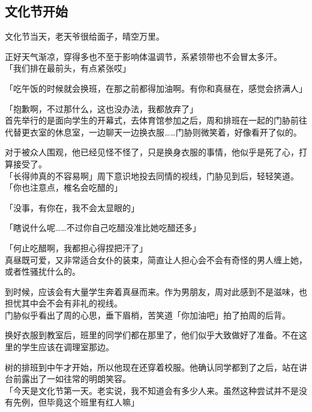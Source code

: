 \subsection{文化节开始}

文化节当天，老天爷很给面子，晴空万里。

正好天气渐凉，穿得多也不至于影响体温调节，系紧领带也不会冒太多汗。\\

「我们排在最前头，有点紧张哎」

「吃午饭的时候就会换班，在那之前都得加油啊。有你和真昼在，感觉会挤满人」

「抱歉啊，不过那什么，这也没办法，我都放弃了」\\

首先举行的是面向学生的开幕式，去体育馆参加之后，周和排班在一起的门胁前往代替更衣室的休息室，一边聊天一边换衣服……门胁则微笑着，好像看开了似的。

对于被众人围观，他已经见怪不怪了，只是换身衣服的事情，他似乎是死了心，打算接受了。\\

「长得帅真的不容易啊」周下意识地投去同情的视线，门胁见到后，轻轻笑道。\\

「你也注意点，椎名会吃醋的」

「没事，有你在，我不会太显眼的」

「瞎说什么呢……不过你自己吃醋没准比她吃醋还多」

「何止吃醋啊，我都担心得捏把汗了」\\

真昼既可爱，又非常适合女仆的装束，简直让人担心会不会有奇怪的男人缠上她，或者性骚扰什么的。

到时候，应该会有大量学生奔着真昼而来。作为男朋友，周对此感到不是滋味，也担忧其中会不会有非礼的视线。\\

门胁似乎看出了周的心思，垂下眉梢，苦笑道「你加油吧」拍了拍周的后背。\\

\vspace{2\baselineskip}

换好衣服到教室后，班里的同学们都在那里了，他们似乎大致做好了准备。不在这里的学生应该在调理室那边。

树的排班到中午才开始，所以他现在还穿着校服。他确认同学都到了之后，站在讲台前露出了一如往常的明朗笑容。\\

「今天是文化节第一天。老实说，我不知道会有多少人来。虽然这种尝试并不是没有先例，但毕竟这个班里有红人嘛」\\


